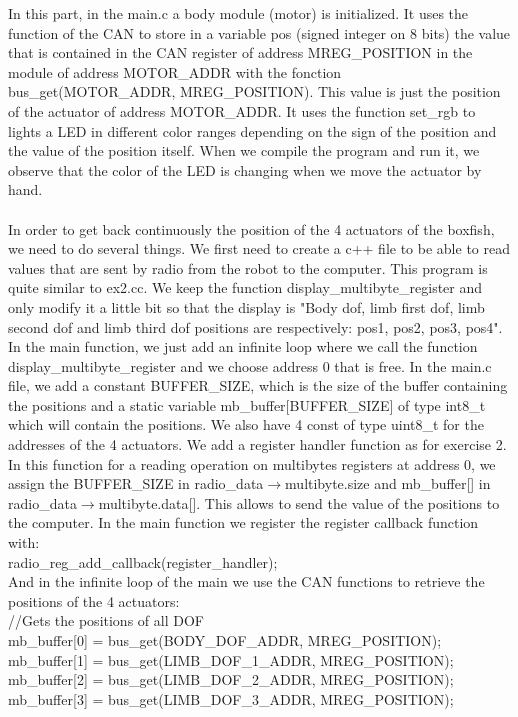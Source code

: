 \documentclass[11pt]{article}
\begin{document}
In this part, in the main.c a body module (motor) is initialized. It uses the function of the CAN to store in a variable pos (signed integer on 8 bits) the value that is contained in the CAN register of address MREG\_POSITION in the module of address MOTOR\_ADDR with the fonction bus\_get(MOTOR\_ADDR, MREG\_POSITION). This value is just the position of the actuator of address MOTOR\_ADDR. It uses the function set\_rgb to lights a LED in different color ranges depending on the sign of the position and the value of the position itself. When we compile the program and run it, we observe that the color of the LED is changing when we move the actuator by hand.
\\
\\
In order to get back continuously the position of the 4 actuators of the boxfish, we need to do several things. We first need to create a c++ file to be able to read values that are sent by radio from the robot to the computer. This program is quite similar to ex2.cc. We keep the function display\_multibyte\_register and only modify it a little bit so that the display is "Body dof, limb first dof, limb second dof and limb third dof positions are respectively: pos1, pos2, pos3, pos4". In the main function, we just add an infinite loop where we call the function display\_multibyte\_register and we choose address 0 that is free. In the main.c file, we add a constant BUFFER\_SIZE, which is the size of the buffer containing the positions and a static variable mb\_buffer[BUFFER\_SIZE] of type int8\_t which will contain the positions. We also have 4 const of type uint8\_t for the addresses of the 4 actuators. We add a register handler function as for exercise 2. In this function for a reading operation on multibytes registers at address 0, we assign the BUFFER\_SIZE in radio\_data${\rightarrow}$multibyte.size and mb\_buffer[] in radio\_data${\rightarrow}$multibyte.data[]. This allows to send the value of the positions to the computer. In the main function we register the register callback function with:
\\
radio\_reg\_add\_callback(register\_handler);
\\
And in the infinite loop of the main we use the CAN functions to retrieve the positions of the 4 actuators:
\\
//Gets the positions of all DOF
\\
mb\_buffer[0] = bus\_get(BODY\_DOF\_ADDR, MREG\_POSITION);
\\
mb\_buffer[1] = bus\_get(LIMB\_DOF\_1\_ADDR, MREG\_POSITION);
\\
mb\_buffer[2] = bus\_get(LIMB\_DOF\_2\_ADDR, MREG\_POSITION);
\\
mb\_buffer[3] = bus\_get(LIMB\_DOF\_3\_ADDR, MREG\_POSITION);
\end{document}
